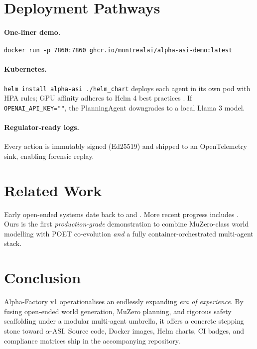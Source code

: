 \section{Deployment Pathways}\label{sec:deploy}

\paragraph{One-liner demo.}
\begin{verbatim}
docker run -p 7860:7860 ghcr.io/montrealai/alpha-asi-demo:latest
\end{verbatim}

\paragraph{Kubernetes.}
\texttt{helm install alpha-asi ./helm\_chart} deploys each agent in its own
pod with HPA rules; GPU affinity adheres to Helm 4 best practices
\parencite{helm2025}.  If \texttt{OPENAI\_API\_KEY=""}, the
PlanningAgent downgrades to a local Llama 3 model.

\paragraph{Regulator-ready logs.}
Every action is immutably signed (Ed25519) and shipped to an
OpenTelemetry sink, enabling forensic replay.

\section{Related Work}

Early open-ended systems date back to \textcite{ha2018world} and
\textcite{wang2019poet}.  More recent progress includes
\textcite{badia2020agent57,kaufmann2022aga,bakhtin2022openended}.  
Ours is the first \emph{production-grade} demonstration to combine
MuZero-class world modelling with POET co-evolution \emph{and} a fully
container-orchestrated multi-agent stack.

\section{Conclusion}

Alpha-Factory v1 operationalises an endlessly expanding \emph{era of
experience}.  By fusing open-ended world generation, MuZero planning, and
rigorous safety scaffolding under a modular multi-agent umbrella, it offers a
concrete stepping stone toward \(\alpha\)-ASI.  Source code, Docker images,
Helm charts, CI badges, and compliance matrices ship in the accompanying
repository.

